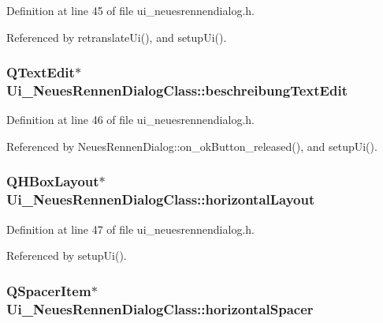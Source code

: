 Definition at line 45 of file ui\_\-neuesrennendialog.h.

Referenced by retranslateUi(), and setupUi().\hypertarget{class_ui___neues_rennen_dialog_class_0d8e036f38577007c155d374a80a9f41}{
\subsubsection[beschreibungTextEdit]{\setlength{\rightskip}{0pt plus 5cm}QTextEdit$\ast$ {\bf Ui\_\-NeuesRennenDialogClass::beschreibungTextEdit}}}
\label{class_ui___neues_rennen_dialog_class_0d8e036f38577007c155d374a80a9f41}




Definition at line 46 of file ui\_\-neuesrennendialog.h.

Referenced by NeuesRennenDialog::on\_\-okButton\_\-released(), and setupUi().\hypertarget{class_ui___neues_rennen_dialog_class_e1a207b3a37d62a05583b95c56603190}{
\subsubsection[horizontalLayout]{\setlength{\rightskip}{0pt plus 5cm}QHBoxLayout$\ast$ {\bf Ui\_\-NeuesRennenDialogClass::horizontalLayout}}}
\label{class_ui___neues_rennen_dialog_class_e1a207b3a37d62a05583b95c56603190}




Definition at line 47 of file ui\_\-neuesrennendialog.h.

Referenced by setupUi().\hypertarget{class_ui___neues_rennen_dialog_class_bd1fd6e28cf47bf5ad89aa84ef560075}{
\subsubsection[horizontalSpacer]{\setlength{\rightskip}{0pt plus 5cm}QSpacerItem$\ast$ {\bf Ui\_\-NeuesRennenDialogClass::horizontalSpacer}}}
\label{class_ui___neues_rennen_dialog_class_bd1fd6e28cf47bf5ad89aa84ef560075}




